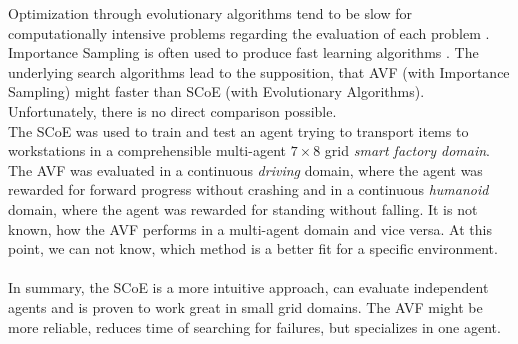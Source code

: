 Optimization through evolutionary algorithms tend to be slow for computationally intensive problems regarding the evaluation of each problem \cite{cruz}. Importance Sampling is often used to produce fast learning algorithms \cite{chen18, schaal04}. The underlying search algorithms lead to the supposition, that AVF (with Importance Sampling) might faster than SCoE (with Evolutionary Algorithms). Unfortunately, there is no direct comparison possible.\\
The SCoE was used to train and test an agent trying to transport items to workstations in a comprehensible multi-agent $7 \times 8$ grid \textit{smart factory domain}. The AVF was evaluated in a continuous \textit{driving} domain, where the agent was rewarded for forward progress without crashing and in a continuous \textit{humanoid} domain, where the agent was rewarded for standing without falling. It is not known, how the AVF performs in a multi-agent domain and vice versa. At this point, we can not know, which method is a better fit for a specific environment.\\\\
In summary, the SCoE is a more intuitive approach, can evaluate independent agents and is proven to work great in small grid domains. The AVF might be more reliable, reduces time of searching for failures, but specializes in one agent.